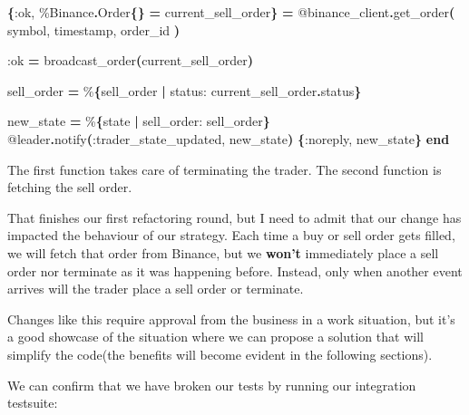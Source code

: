 \documentclass[
  oneside]{book}
\newenvironment{Shaded}{\begin{snugshade}}{\end{snugshade}}
\newcommand{\ConstantTok}[1]{\textcolor[rgb]{0.56,0.35,0.01}{#1}}
\newcommand{\FunctionTok}[1]{\textcolor[rgb]{0.13,0.29,0.53}{\textbf{#1}}}
\newcommand{\KeywordTok}[1]{\textcolor[rgb]{0.13,0.29,0.53}{\textbf{#1}}}
\newcommand{\NormalTok}[1]{#1}
\newcommand{\OperatorTok}[1]{\textcolor[rgb]{0.81,0.36,0.00}{\textbf{#1}}}
\newcommand{\OtherTok}[1]{\textcolor[rgb]{0.56,0.35,0.01}{#1}}
\newcommand{\VariableTok}[1]{\textcolor[rgb]{0.00,0.00,0.00}{#1}}
\begin{document}
\begin{Shaded}
\begin{Highlighting}[]
    \FunctionTok{\{}\VariableTok{:ok}\NormalTok{, \%}\ConstantTok{Binance}\OperatorTok{.}\ConstantTok{Order}\FunctionTok{\{\}} \OperatorTok{=}\NormalTok{ current\_sell\_order}\FunctionTok{\}} \OperatorTok{=}
      \OtherTok{@binance\_client}\OperatorTok{.}\NormalTok{get\_order}\FunctionTok{(}
\NormalTok{        symbol,}
\NormalTok{        timestamp,}
\NormalTok{        order\_id}
      \FunctionTok{)}

    \VariableTok{:ok} \OperatorTok{=}\NormalTok{ broadcast\_order}\FunctionTok{(}\NormalTok{current\_sell\_order}\FunctionTok{)}

\NormalTok{    sell\_order }\OperatorTok{=}\NormalTok{ \%}\FunctionTok{\{}\NormalTok{sell\_order }\OperatorTok{|} \VariableTok{status:}\NormalTok{ current\_sell\_order}\OperatorTok{.}\NormalTok{status}\FunctionTok{\}}

\NormalTok{    new\_state }\OperatorTok{=}\NormalTok{ \%}\FunctionTok{\{}\NormalTok{state }\OperatorTok{|} \VariableTok{sell\_order:}\NormalTok{ sell\_order}\FunctionTok{\}}
    \OtherTok{@leader}\OperatorTok{.}\NormalTok{notify}\FunctionTok{(}\VariableTok{:trader\_state\_updated}\NormalTok{, new\_state}\FunctionTok{)}
    \FunctionTok{\{}\VariableTok{:noreply}\NormalTok{, new\_state}\FunctionTok{\}}
  \KeywordTok{end}
\end{Highlighting}
\end{Shaded}

The first function takes care of terminating the trader. The second function is fetching the sell order.

That finishes our first refactoring round, but I need to admit that our change has impacted the behaviour of our strategy. Each time a buy or sell order gets filled, we will fetch that order from Binance, but we \textbf{won't} immediately place a sell order nor terminate as it was happening before. Instead, only when another event arrives will the trader place a sell order or terminate.

Changes like this require approval from the business in a work situation, but it's a good showcase of the situation where we can propose a solution that will simplify the code(the benefits will become evident in the following sections).

We can confirm that we have broken our tests by running our integration testsuite:
\end{document}
